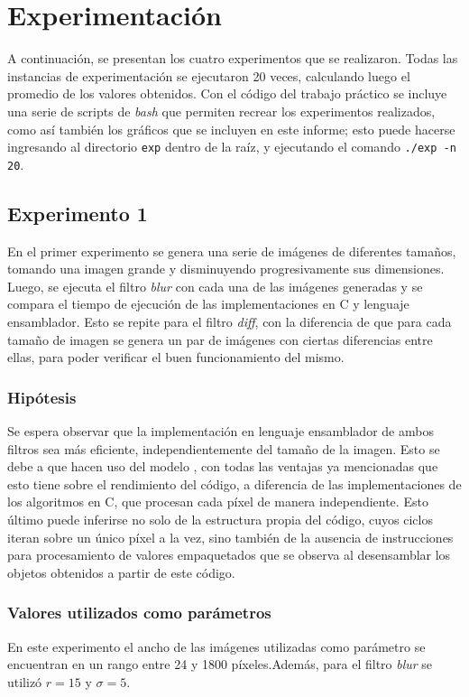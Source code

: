 \section{Experimentación}
    A continuación, se presentan los cuatro experimentos que se realizaron. Todas las instancias de experimentación se ejecutaron 20 veces, calculando luego el promedio de los valores obtenidos. Con el código del trabajo práctico se incluye una serie de scripts de \emph{bash} que permiten recrear los experimentos realizados, como así también los gráficos que se incluyen en este informe; esto puede hacerse ingresando al directorio \texttt{exp} dentro de la raíz, y ejecutando el comando \texttt{./exp -n 20}.

    \subsection{Experimento 1}
        En el primer experimento se genera una serie de imágenes de diferentes tamaños, tomando una imagen grande y disminuyendo progresivamente sus dimensiones.
        Luego, se ejecuta el filtro \emph{blur} con cada una de las imágenes generadas y se compara el tiempo de ejecución de las implementaciones en C y lenguaje ensamblador.
        Esto se repite para el filtro \emph{diff}, con la diferencia de que para cada tamaño de imagen se genera 
        un par de imágenes con ciertas diferencias entre ellas, para poder verificar el buen funcionamiento del mismo.

        \subsubsection*{Hipótesis} 
            Se espera observar que la implementación en lenguaje ensamblador de ambos filtros sea más eficiente, independientemente del tamaño de la imagen. Esto se debe a que hacen uso del modelo , con todas las ventajas ya mencionadas que esto tiene sobre el rendimiento del código, a diferencia de las implementaciones de los algoritmos en C, que procesan cada píxel de manera independiente. Esto último puede inferirse no solo de la estructura propia del código, cuyos ciclos iteran sobre un único píxel a la vez, sino también de la ausencia de instrucciones  para procesamiento de valores empaquetados que se observa al desensamblar los objetos obtenidos a partir de este código.

        \subsubsection*{Valores utilizados como parámetros}         
            En este experimento el ancho de las imágenes utilizadas como parámetro se encuentran en un rango entre 24 y 1800 píxeles.Además, para el filtro \emph{blur} se utilizó $r = 15$ y $\sigma = 5$.

